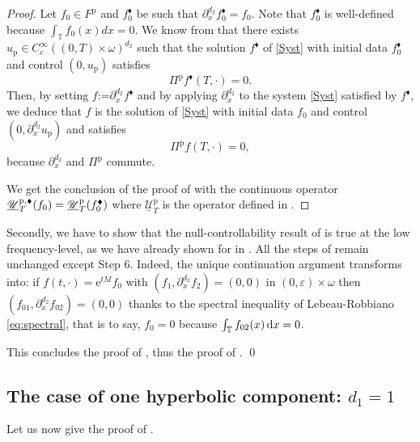 \documentclass[JEP,XML,SOM,Unicode,NoEqCountersInSection]{cedram}
\let\mathcal\mathscr
\newcommand{\sblacklozenge}{{\scriptscriptstyle \blacklozenge}}
\theoremstyle{plain}
\theoremstyle{definition}
\theoremstyle{remark}
\newcommand{\diff}[1][-3]{\ensuremath{\mathop{}\mkern#1mu\mathrm{d}}}
\newcommand{\set}{\mathbb}
\newcommand{\T}{\set{T}}
\newcommand{\coloneqq}{\mathrel{\mathord{:}\mathord=}}
\newcommand{\p}{{\mathrm p}}
\newcommand{\eu}{\mathrm e}
\let\originalleft\left
\let\originalright\right
\renewcommand{\left}{\mathopen{}\mathclose\bgroup\originalleft}
\renewcommand{\right}{\aftergroup\egroup\originalright}
\begin{document}
\begin{proof}
Let $f_0 \in F^{\p}$ and $f_0^{\sblacklozenge}$ be such that $\partial_{x}^{d_2}f_0^{\sblacklozenge} = f_0$. Note that $f_0^{\sblacklozenge}$ is well-defined because $\int_{\T} f_0(x) dx = 0$. We know from  that there exists $u_{\p} \in C^\infty_c((0,T)\times\omega)^{d_2}$ such that the solution $f^{\sblacklozenge}$ of \eqref{Syst} with initial data $f_0^{\sblacklozenge}$ and control $(0,u_{\p})$ satisfies
\[
\Pi^{\p} f^{\sblacklozenge}(T,\cdot)=0.
\]
Then, by setting $f\coloneqq \partial_{x}^{d_2} f^{\sblacklozenge}$ and by applying $\partial_{x}^{d_2}$ to the system \eqref{Syst} satisfied by $f^{\sblacklozenge}$, we deduce that $f$ is the solution of \eqref{Syst} with initial data $f_0$ and control $(0, \partial_x^{d_2}u_{\p})$ and satisfies
\[
\Pi^{\p} f(T,\cdot)=0,
\]
because $\partial_{x}^{d_2}$ and $\Pi^{\p}$ commute.

We get the conclusion of the proof of  with the continuous operator $\underline{\mathcal{U}}_T^{\p,\sblacklozenge}(f_0) = \underline{\mathcal{U}}_T^\p\left(f_0^{\sblacklozenge}\right)$ where $\underline{\mathcal{U}}_T^\p$ is the operator defined in .
\end{proof}

Secondly, we have to show that the null-controllability result of  is true at the low frequency-level, as we have already shown for  in . All the steps of  remain unchanged except Step $6$. Indeed, the unique continuation argument transforms into: if $f(t,\cdot) = \eu^{tM} f_0$ with $(f_1, \partial_{x}^{d_2} f_2) = (0,0)$ in $(0,\varepsilon)\times\omega$ then $(f_{01}, \partial_{x}^{d_2} f_{02})= (0,0)$ thanks to the spectral inequality of Lebeau-Robbiano \eqref{eq:spectral}, that is to say, $f_0 = 0$ because $\int_{\T} f_{02}(x) \diff x =0$.

This concludes the proof of , thus the proof of . \qed

\subsection{The case of one hyperbolic component: $d_1 = 1$}
\label{SectionControlHyperbolicd_1=1}
Let us now give the proof of .
\end{document}
